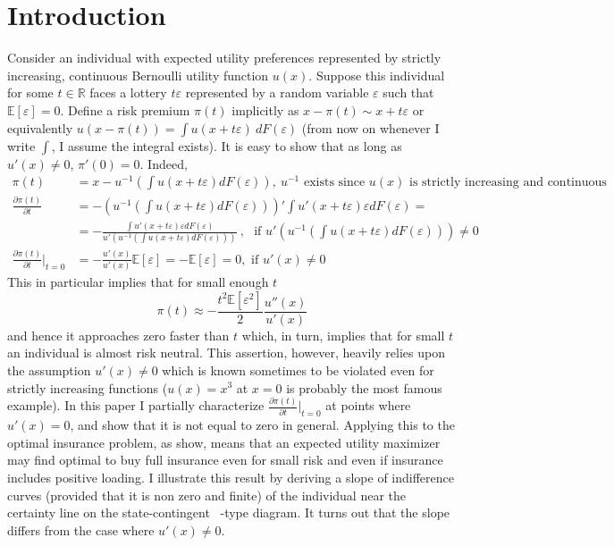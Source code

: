 \documentclass[a4paper]{article}
\newcommand{\expect}{\mathbb{E}}
\newcommand{\eps}{\varepsilon}
\begin{document}
	\section{Introduction}
	Consider an individual with expected utility preferences represented by strictly increasing, continuous Bernoulli utility function $u(x)$. Suppose this individual for some $t \in \mathbb{R}$ faces a lottery $t \eps$ represented by a random variable $\varepsilon$ such that $\expect[\varepsilon] = 0$. Define a risk premium $\pi(t)$ implicitly as $x-\pi(t) \sim x+t\eps$ or equivalently $u(x - \pi(t)) = \int u(x + t \eps)\ dF(\eps)$ (from now on whenever I write $\int$, I assume the integral exists). It is easy to show that as long as $u'(x) \neq 0$, $\pi'(0) = 0$. Indeed, 
	\begin{align*}
	\pi(t) &= x - u^{-1}\left( \int u(x + t \varepsilon) dF(\varepsilon) \right),\ u^{-1} \text{ exists since }u(x)\text{ is strictly increasing and continuous}\\
	\frac{\partial \pi(t)}{\partial t} &= -\left(u^{-1}\left( \int u(x + t \varepsilon) dF(\varepsilon) \right) \right)' \int u'(x+t \varepsilon)\varepsilon dF(\varepsilon) = \\
	&=-\frac{\int u'(x+t \varepsilon)\varepsilon dF(\varepsilon)}{u'\left(u^{-1}\left( \int u(x + t \varepsilon) dF(\varepsilon) \right)\right)}\ ,\ \ \  \text{if }u'\left(u^{-1}\left( \int u(x + t \varepsilon) dF(\varepsilon) \right)\right) \neq 0\\
	\frac{\partial \pi(t)}{\partial t}\bigg|_{t=0} &= -\frac{u'(x)}{u'(x)} \expect[\eps] = -\expect[\eps] = 0, \text{ if } u'(x) \neq 0
	\end{align*}
This in particular implies that for small enough $t$ $$\pi(t) \approx -\frac{t^2 \expect[\eps^2]}{2}\frac{u''(x)}{u'(x)}$$ and hence it approaches zero faster than $t$ which, in turn, implies that for small $t$ an individual is almost risk neutral. This assertion, however, heavily relies upon the assumption $u'(x) \neq 0$ which is known sometimes to be violated even for strictly increasing functions ($u(x) = x^3$ at $x=0$ is probably the most famous example). 
In this paper I partially characterize $\frac{\partial \pi(t)}{\partial t}\bigg|_{t=0}$ at points where $u'(x) = 0$, and show that it is not equal to zero in general. Applying this to the optimal insurance problem, as \cite{segal1990first} show, means that an expected utility maximizer may find optimal to buy full insurance even for small risk and even if insurance includes positive loading. I illustrate this result by deriving a slope of indifference curves (provided that it is non zero and finite) of the individual near the certainty line on the state-contingent  \cite{yaari1978some}-type diagram. It turns out that the slope differs from the case where $u'(x) \neq 0$.
\end{document}

